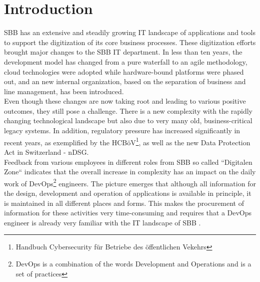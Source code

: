 \documentclass[a4paper,12pt]{article}
\begin{document}
    \section{Introduction}
    \label{sec:introduction}
    SBB has an extensive and steadily growing IT landscape of applications and tools to support the digitization of its
    core business processes.
    These digitization efforts brought major changes to the SBB IT department.
    In less than ten years, the development model has changed from a pure waterfall to an agile methodology,
    cloud technologies were adopted while hardware-bound platforms were phased out, and an new internal organization,
    based on the separation of business and line management, has been introduced.\\
    Even though these changes are now taking root and leading to various positive outcomes, they still pose a challenge.
    There is a new complexity with the rapidly changing technological landscape but also due to very many old,
    business-critical legacy systems.
    In addition, regulatory pressure has increased significantly in recent years, as exemplified by the
    HCBöV\footnote{Handbuch Cybersecurity für Betriebe des öffentlichen Vekehrs}, as well as the new Data Protection Act in Switzerland - nDSG.\\
    Feedback from various employees in different roles from SBB so called ``Digitalen Zone`` indicates that the overall
    increase in complexity has an impact on the daily work of DevOps\footnote{DevOps is a combination of the words
    Development and Operations and is a set of practices} engineers.
    The picture emerges that although all information for the design, development and operation of
    applications is available in principle, it is maintained in all different places and forms.
    This makes the procurement of information for these activities very time-consuming and requires that a DevOps
    engineer is already very familiar with the IT landscape of SBB .
\end{document}
